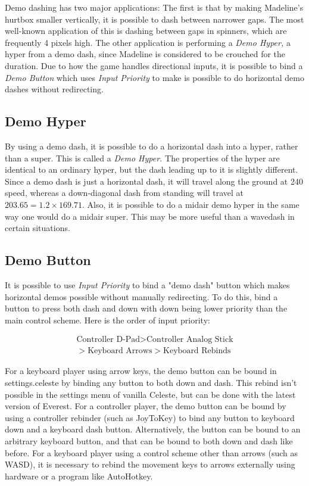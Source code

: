 \documentclass[oneside]{book}
\begin{document}
Demo dashing has two major applications: The first is that by making Madeline's hurtbox smaller vertically, it is possible to dash between narrower gaps. The most well-known application of this is dashing between gaps in spinners, which are frequently 4 pixels high. The other application is performing a \textit{Demo Hyper,} a hyper from a demo dash, since Madeline is considered to be crouched for the duration. Due to how the game handles directional inputs, it is possible to bind a \textit{Demo Button} which uses \textit{Input Priority} to make is possible to do horizontal demo dashes without redirecting.

\subsection{Demo Hyper}

By using a demo dash, it is possible to do a horizontal dash into a hyper, rather than a super. This is called a \textit{Demo Hyper.} The properties of the hyper are identical to an ordinary hyper, but the dash leading up to it is slightly different. Since a demo dash is just a horizontal dash, it will travel along the ground at 240 speed, whereas a down-diagonal dash from standing will travel at $203.65=1.2\times169.71$. Also, it is possible to do a midair demo hyper in the same way one would do a midair super. This may be more useful than a wavedash in certain situations.

\subsection{Demo Button}

It is possible to use \textit{Input Priority} to bind a "demo dash" button which makes horizontal demos possible without manually redirecting. To do this, bind a button to press both dash and down with down being lower priority than the main control scheme. Here is the order of input priority: 

\begin{align*}
\text{Controller D-Pad} > \text{Controller Analog Stick}\\
> \text{Keyboard Arrows} > \text{Keyboard Rebinds}
\end{align*}

For a keyboard player using arrow keys, the demo button can be bound in settings.celeste by binding any button to both down and dash. This rebind isn't possible in the settings menu of vanilla Celeste, but can be done with the latest version of Everest. For a controller player, the demo button can be bound by using a controller rebinder (such as JoyToKey) to bind any button to keyboard down and a keyboard dash button. Alternatively, the button can be bound to an arbitrary keyboard button, and that can be bound to both down and dash like before. For a keyboard player using a control scheme other than arrows (such as WASD), it is necessary to rebind the movement keys to arrows externally using hardware or a program like AutoHotkey.
\end{document}
